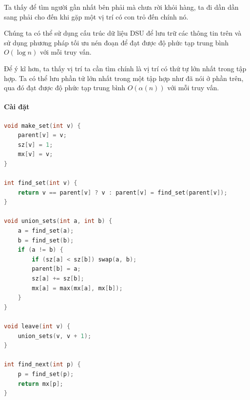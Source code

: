 Ta thấy để tìm người gần nhất bên phải mà chưa rời khỏi hàng, ta đi dần dần sang phải cho đến khi gặp một vị trí có con trỏ đến chính nó.

Chúng ta có thể sử dụng cấu trúc dữ liệu DSU để lưu trữ các thông tin trên và sử dụng phương pháp tối ưu nén đoạn để đạt được độ phức tạp trung bình \(O(\log n)\) với mỗi truy vấn.

Để ý kĩ hơn, ta thấy vị trí ta cần tìm chính là vị trí có thứ tự lớn nhất trong tập hợp. Ta có thể lưu phần tử lớn nhất trong một tập hợp như đã nói ở phần trên, qua đó đạt được độ phức tạp trung bình \(O(\alpha(n))\) với mỗi truy vấn.

\paragraph{Cài đặt}
\begin{lstlisting}[language=C++]
void make_set(int v) {
    parent[v] = v;
    sz[v] = 1;
    mx[v] = v;
}

int find_set(int v) {
    return v == parent[v] ? v : parent[v] = find_set(parent[v]);
}

void union_sets(int a, int b) {
    a = find_set(a);
    b = find_set(b);
    if (a != b) {
        if (sz[a] < sz[b]) swap(a, b);
        parent[b] = a;
        sz[a] += sz[b];
        mx[a] = max(mx[a], mx[b]);
    }
}

void leave(int v) { 
    union_sets(v, v + 1);
}

int find_next(int p) { 
    p = find_set(p);
    return mx[p];
}
\end{lstlisting}

